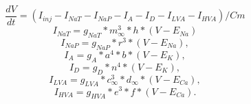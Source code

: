 \begin{equation}
\frac{dV}{dt} = (I_{inj} - I_{NaT} - I_{NaP} - I_{A} - I_{D} - I_{LVA} - I_{HVA})/Cm
\end{equation}
\begin{equation}
I_{NaT} = g_{NaT} * m_{{\infty}}^3 * h * (V - E_{Na})
\end{equation}
\begin{equation}
I_{NaP} = g_{NaP} * r^3 * (V - E_{Na}),
\end{equation}
\begin{equation}
I_{A} = g_{A} * a^4 * b * (V - E_{K}),
\end{equation}
\begin{equation}
I_{D} = g_{D} * n^4 * (V - E_{K}),
\end{equation}
\begin{equation}
I_{LVA} = g_{LVA} * c_{{\infty}}^3 * d_{{\infty}} * (V - E_{Ca}),
\end{equation}
\begin{equation}
I_{HVA} = g_{HVA} * e^3 * f * (V - E_{Ca}).
\label{eq:channels}
\end{equation}
